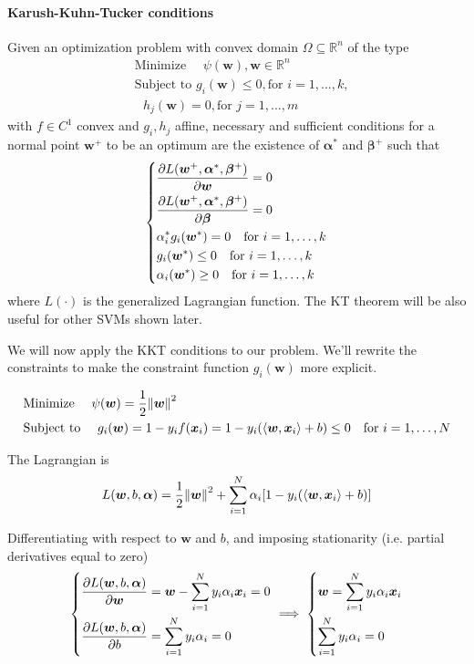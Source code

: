 \documentclass[oneside,onecolumn]{report}
\newcommand{\inp}[2]{\left\langle #1, #2 \right\rangle}
\begin{document}
\paragraph{Karush-Kuhn-Tucker conditions}
Given an optimization problem with convex domain $\Omega \subseteq \mathbb R^n$ of the type
\begin{align*}
    &\text{Minimize   } \quad \psi(\bm w), \bm w \in \mathbb R^n \\
    &\text{Subject to } g_i(\bm w) \leq 0, \text{for } i = 1, \dots, k, \\
    &\text{           } h_j(\bm w) = 0, \text{for } j = 1, \dots, m
\end{align*}
with $f \in C^1$ convex and $g_i, h_j$ affine, necessary and sufficient conditions for a normal point $\bm w^+$ to be an optimum are the existence of $\bm \alpha^*$ and $\bm \beta^+$ such that
$$
\begin{dcases}
    \pdv{L(\bm w^+, \bm \alpha^*, \bm \beta^+)}{\bm w} = 0 \\
    \pdv{L(\bm w^+, \bm \alpha^*, \bm \beta^+)}{\bm \beta} = 0 \\
    \alpha_i^* g_i(\bm w^*) = 0 \quad \text{for } i = 1, \dots, k \\
    g_i(\bm w^*) \leq 0 \quad \text{for } i = 1, \dots, k \\
    \alpha_i(\bm w^*) \geq 0 \quad \text{for } i = 1, \dots, k \\
\end{dcases}
$$
where $L(\cdot)$ is the generalized Lagrangian function.
The KT theorem will be also useful for other SVMs shown later.

We will now apply the KKT conditions to our problem.
We'll rewrite the constraints to make the constraint function $g_i(\bm w)$ more explicit.

\begin{align*}
    &\text{Minimize   } \quad \psi(\bm w) = \frac{1}{2} \norm{\bm w}^2 \\
    &\text{Subject to } \quad g_i(\bm w) = 1 - y_i f(\bm x_i) = 1 - y_i (\inp{\bm w}{\bm x_i} + b) \leq 0 \quad \text{for } i = 1, \dots, N
\end{align*}


The Lagrangian is
$$ L(\bm w, b, \bm \alpha) = \frac{1}{2} \norm{\bm w}^2 + \sum_{i = 1}^N \alpha_i [1 - y_i (\inp{\bm w}{\bm x_i} + b)] $$

Differentiating with respect to $\bm w$ and $b$, and imposing stationarity (i.e. partial derivatives equal to zero)
$$ \begin{dcases}
    \pdv{L(\bm w, b, \bm \alpha)}{\bm w} = \bm w - \sum_{i = 1}^N y_i \alpha_i \bm x_i = 0 \\
    \pdv{L(\bm w, b, \bm \alpha)}{b} = \sum_{i = 1}^N y_i \alpha_i = 0
\end{dcases} \implies
\begin{dcases}
    \bm w = \sum_{i = 1}^N y_i \alpha_i \bm x_i \\
    \sum_{i = 1}^N y_i \alpha_i = 0
\end{dcases}
$$
\end{document}
